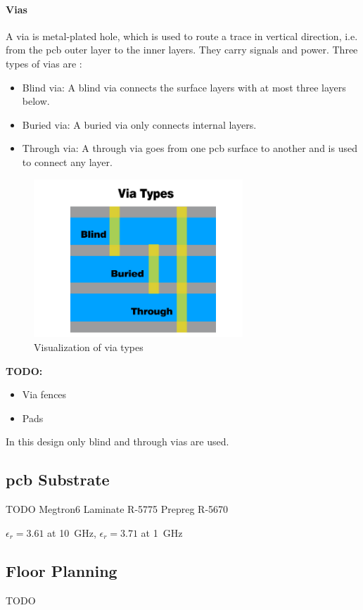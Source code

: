 \paragraph{Vias}
A via is metal-plated hole, which is used to route a trace in vertical direction, i.e. from the \gls{pcb} outer layer to the inner layers. They carry signals and power. Three types of vias are \cite{vias}:
\begin{itemize}
	\item Blind via: A blind via connects the surface layers with at most three layers below.
	\item Buried via: A buried via only connects internal layers.
	\item Through via: A through via goes from one \gls{pcb} surface to another and is used to connect any layer. 
\end{itemize}
\begin{figure}[tbh]
	\centering
	\includegraphics[width = 0.7\textwidth]{chap/04-work/img/vias}
	\caption[Via types]{Visualization of via types \cite{vias}}
	\label{fig:vias}
\end{figure}
\textbf{TODO:} 
	\begin{itemize}
		\item Via fences
		\item Pads
	\end{itemize}

In this design only blind and through vias are used.

\subsection{\gls{pcb} Substrate}
TODO
Megtron6 Laminate R-5775 Prepreg R-5670

$\epsilon_r = 3.61$ at \SI{10}{\giga \hertz}, $\epsilon_r = 3.71$ at \SI{1}{\giga \hertz}
\subsection{Floor Planning}
TODO
